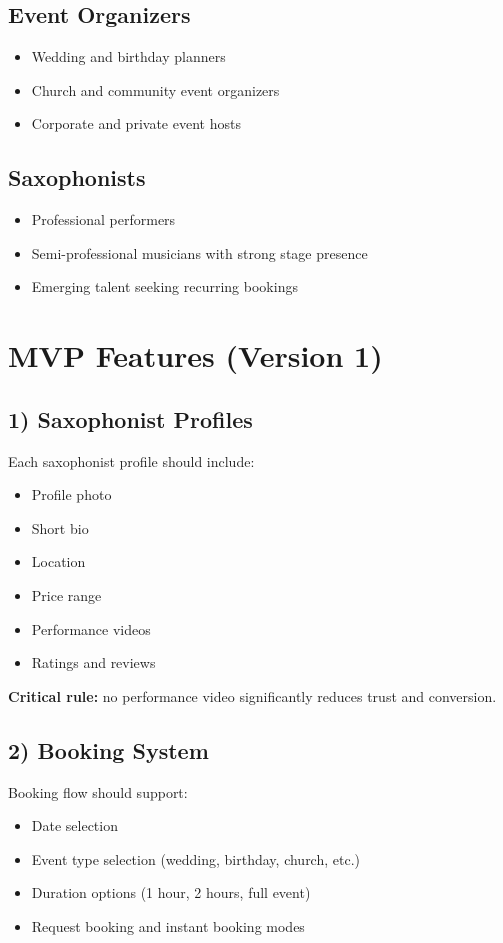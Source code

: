 \documentclass[11pt,a4paper]{article}
\begin{document}
\subsection{Event Organizers}
\begin{itemize}[leftmargin=1.5em]
    \item Wedding and birthday planners
    \item Church and community event organizers
    \item Corporate and private event hosts
\end{itemize}

\subsection{Saxophonists}
\begin{itemize}[leftmargin=1.5em]
    \item Professional performers
    \item Semi-professional musicians with strong stage presence
    \item Emerging talent seeking recurring bookings
\end{itemize}

\section{MVP Features (Version 1)}

\subsection{1) Saxophonist Profiles}
Each saxophonist profile should include:
\begin{itemize}[leftmargin=1.5em]
    \item Profile photo
    \item Short bio
    \item Location
    \item Price range
    \item Performance videos
    \item Ratings and reviews
\end{itemize}

\textbf{Critical rule:} no performance video significantly reduces trust and conversion.

\subsection{2) Booking System}
Booking flow should support:
\begin{itemize}[leftmargin=1.5em]
    \item Date selection
    \item Event type selection (wedding, birthday, church, etc.)
    \item Duration options (1 hour, 2 hours, full event)
    \item Request booking and instant booking modes
\end{itemize}
\end{document}

